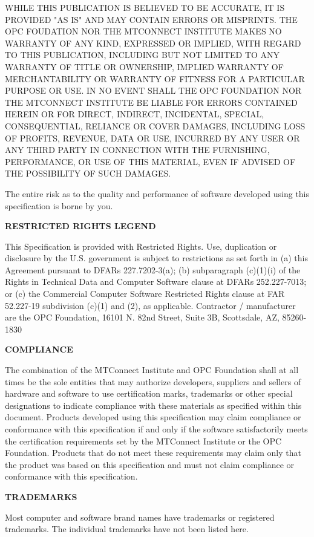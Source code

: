 \documentclass{mtconnect}	%
\begin{document}
WHILE THIS PUBLICATION IS BELIEVED TO BE ACCURATE, IT IS PROVIDED "AS IS" AND MAY CONTAIN ERRORS OR MISPRINTS. THE OPC FOUDATION NOR THE MTCONNECT INSTITUTE MAKES NO WARRANTY OF ANY KIND, EXPRESSED OR IMPLIED, WITH REGARD TO THIS PUBLICATION, INCLUDING BUT NOT LIMITED TO ANY WARRANTY OF TITLE OR OWNERSHIP, IMPLIED WARRANTY OF MERCHANTABILITY OR WARRANTY OF FITNESS FOR A PARTICULAR PURPOSE OR USE. IN NO EVENT SHALL THE OPC FOUNDATION NOR THE MTCONNECT INSTITUTE BE LIABLE FOR ERRORS CONTAINED HEREIN OR FOR DIRECT, INDIRECT, INCIDENTAL, SPECIAL, CONSEQUENTIAL, RELIANCE OR COVER DAMAGES, INCLUDING LOSS OF PROFITS, REVENUE, DATA OR USE, INCURRED BY ANY USER OR ANY THIRD PARTY IN CONNECTION WITH THE FURNISHING, PERFORMANCE, OR USE OF THIS MATERIAL, EVEN IF ADVISED OF THE POSSIBILITY OF SUCH DAMAGES.

The entire risk as to the quality and performance of software developed using this specification is borne by you. 

\textbf{RESTRICTED RIGHTS LEGEND}

This Specification is provided with Restricted Rights. Use, duplication or disclosure by the U.S. government is subject to restrictions as set forth in (a) this Agreement pursuant to DFARs 227.7202-3(a); (b) subparagraph (c)(1)(i) of the Rights in Technical Data and Computer Software clause at DFARs 252.227-7013; or (c) the Commercial Computer Software Restricted Rights clause at FAR 52.227-19 subdivision (c)(1) and (2), as applicable. Contractor / manufacturer are the OPC Foundation, 16101 N. 82nd Street, Suite 3B, Scottsdale, AZ, 85260-1830

\textbf{COMPLIANCE}

The combination of the MTConnect Institute and OPC Foundation shall at all times be the sole entities that may authorize developers, suppliers and sellers of hardware and software to use certification marks, trademarks or other special designations to indicate compliance with these materials as specified within this document. Products developed using this specification may claim compliance or conformance with this specification if and only if the software satisfactorily meets the certification requirements set by the MTConnect Institute or the OPC Foundation. Products that do not meet these requirements may claim only that the product was based on this specification and must not claim compliance or conformance with this specification. 

\textbf{TRADEMARKS}

Most computer and software brand names have trademarks or registered trademarks. The individual trademarks have not been listed here.
\end{document}
